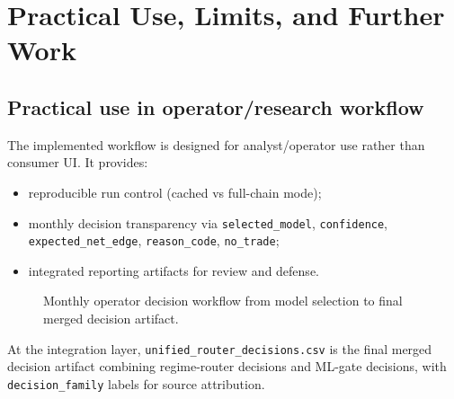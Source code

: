 \documentclass[a4paper,12pt]{extarticle}
\begin{document}
\section{Practical Use, Limits, and Further Work}

\subsection{Practical use in operator/research workflow}

The implemented workflow is designed for analyst/operator use rather than consumer UI. It provides:
\begin{itemize}
\item reproducible run control (cached vs full-chain mode);
\item monthly decision transparency via \texttt{selected\_model}, \texttt{confidence}, \texttt{expected\_net\_edge}, \texttt{reason\_code}, \texttt{no\_trade};
\item integrated reporting artifacts for review and defense.
\end{itemize}

\begin{figure}[htbp]
\centering
{}
\caption{Monthly operator decision workflow from model selection to final merged decision artifact.}
\label{fig:operator_flow}
\end{figure}

At the integration layer, \texttt{unified\_router\_decisions.csv} is the final merged decision artifact combining regime-router decisions and ML-gate decisions, with \texttt{decision\_family} labels for source attribution.
\end{document}
